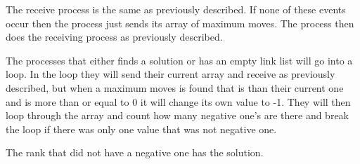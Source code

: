 \documentclass{article}
\begin{document}
	The receive process is the same as previously described. If none of these
	events occur then the process just sends its array of  maximum moves. The 
	process then does the receiving process as previously described.

	The processes that either finds a solution or has an empty link list will go
	into a loop. In the loop they will send their current array and receive as
	previously described, but when a maximum moves is found that is than their
	current one and is more than or equal to 0 it will change its own value to 
	-1. They will then loop through the array and count how many negative one's
	are there and break the loop if there was only one value that was not 
	negative one.

	The rank that did not have a negative one has the solution.
\end{document}
